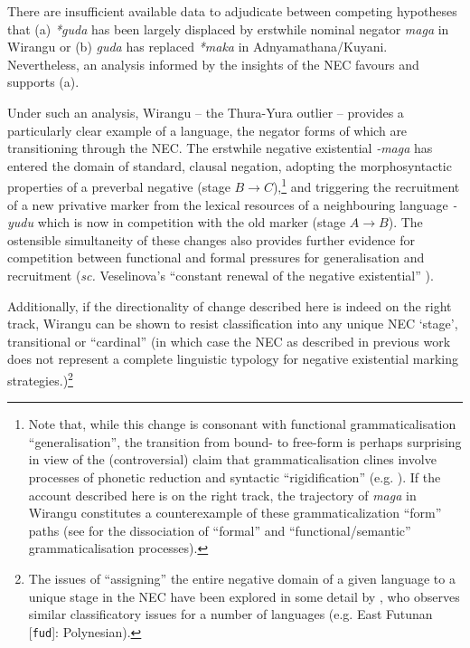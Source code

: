 \documentclass[usenames,dvipsnames,11pt]{article}
\begin{document}
{{ There are insufficient available data to adjudicate between competing hypotheses that (a) \textit{*guda} has been largely displaced by erstwhile nominal negator \textit{maga} in Wirangu or (b) \textit{guda} has replaced \textit{*maka} in Adnyamathana/Kuyani. Nevertheless, an analysis informed by the insights of the NEC favours and supports (a).
 
Under such an analysis, Wirangu -- the Thura-Yura outlier -- provides a particularly clear example of a language, the negator forms of which are transitioning through the NEC. The erstwhile negative existential \textit{-maga} has entered the domain of standard, clausal negation, adopting the morphosyntactic properties of a preverbal negative (stage $B\to C$),\footnote{Note that, while this change is consonant with functional grammaticalisation ``generalisation'', the transition from bound- to free-form is perhaps surprising in view of the (controversial) claim that grammaticalisation clines involve processes of phonetic reduction and syntactic ``rigidification'' (e.g. \citealp{Geurts2000}). If the account described here is on the right track, the trajectory of \textit{maga} in Wirangu constitutes a counterexample of these grammaticalization ``form'' paths (see \citealp[40]{vanderAuwera2008,Ahern2017} for the dissociation of ``formal'' and ``functional/semantic'' grammaticalisation processes).} and triggering the recruitment of a new privative marker from the lexical resources of a neighbouring language \textit{-yudu} which is now in competition with the old marker (stage $A\to B$). The ostensible simultaneity of these changes also provides further evidence for competition between functional and formal pressures for generalisation and recruitment (\textit{sc.} Veselinova's ``constant renewal of the negative existential'' \citeyearpar[173]{Veselinova2016}).

Additionally, if the directionality of change described here is indeed on the right track, Wirangu can be shown to resist classification into any unique NEC `stage', transitional or ``cardinal'' (in which case the NEC as described in previous work does not represent a complete linguistic typology for negative existential marking strategies.)\footnote{The issues of ``assigning'' the entire negative domain of a given language to a unique stage in the NEC have been explored in some detail by \citep{Veselinova2016}, who observes similar classificatory issues for a number of languages (e.g. East Futunan [\texttt{fud}]: Polynesian).}










}}
\end{document}
